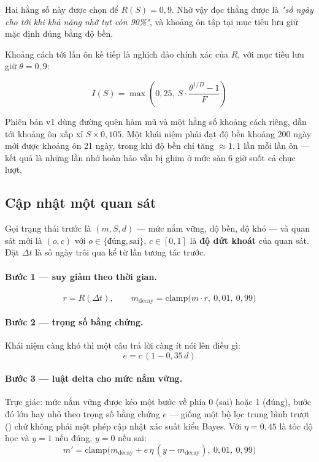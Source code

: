 Hai hằng số này được chọn để \(R(S) = 0{,}9\). Nhờ vậy  đọc thẳng
được là \textit{"số ngày cho tới khi khả năng nhớ tụt còn 90\%"}, và khoảng ôn tập tại mục
tiêu lưu giữ mặc định đúng bằng độ bền.

Khoảng cách tới lần ôn kế tiếp là nghịch đảo chính xác của \(R\), với mục tiêu lưu giữ
\(\theta = 0{,}9\):

\begin{equation}
I(S) = \max\!\left(0{,}25,\ S\cdot\frac{\theta^{1/D} - 1}{F}\right)
\end{equation}

\begin{luuy}
Phiên bản v1 dùng đường quên hàm mũ và một hằng số khoảng cách riêng, dẫn tới khoảng ôn
xấp xỉ \(S \times 0{,}105\). Một khái niệm phải đạt độ bền khoảng 200 ngày mới được khoảng
ôn 21 ngày, trong khi độ bền chỉ tăng \(\approx 1{,}1\) lần mỗi lần ôn — kết quả là những
lần nhớ hoàn hảo vẫn bị ghim ở mức sàn 6 giờ suốt cả chục lượt.
\end{luuy}

\subsection{Cập nhật một quan sát}

Gọi trạng thái trước là \((m, S, d)\) — mức nắm vững, độ bền, độ khó — và quan sát mới là
\((o, c)\) với \(o \in \{\text{đúng}, \text{sai}\}\), \(c \in [0,1]\) là \textbf{độ dứt
khoát} của quan sát. Đặt \(\Delta t\) là số ngày trôi qua kể từ lần tương tác trước.

\paragraph{Bước 1 — suy giảm theo thời gian.}
\begin{equation}
r = R(\Delta t),\qquad m_{\text{decay}} = \mathrm{clamp}\big(m \cdot r,\ 0{,}01,\ 0{,}99\big)
\end{equation}

\paragraph{Bước 2 — trọng số bằng chứng.} Khái niệm càng khó thì một câu trả lời càng ít
nói lên điều gì:
\begin{equation}
e = c\,(1 - 0{,}35\,d)
\end{equation}

\paragraph{Bước 3 — luật delta cho mức nắm vững.} Trực giác: mức nắm vững được kéo một
bước về phía 0 (sai) hoặc 1 (đúng), bước đó lớn hay nhỏ theo trọng số bằng chứng \(e\) —
giống một bộ lọc trung bình trượt () chứ không phải một phép cập nhật xác suất
kiểu Bayes. Với \(\eta = 0{,}45\) là tốc độ học và
\(y = 1\) nếu đúng, \(y = 0\) nếu sai:
\begin{equation}
m' = \mathrm{clamp}\big(m_{\text{decay}} + e\,\eta\,(y - m_{\text{decay}}),\ 0{,}01,\ 0{,}99\big)
\end{equation}

